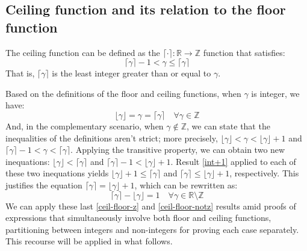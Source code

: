 \subsection*{Ceiling function and its relation to the floor function}

The ceiling function can be defined
as the $\lceil \cdot \rceil : \mathds{R} \to \mathds{Z}$ function
that satisfies:
\begin{equation}\tag{Ceiling}
  \lceil \gamma \rceil - 1 < \gamma \le \lceil \gamma \rceil
\end{equation}
That is,
$\lceil \gamma \rceil$ is the least integer
greater than or equal to $\gamma$.

Based on the definitions of the floor and ceiling functions,
when $\gamma$ is integer, we have:
\begin{equation}\label{ceil-floor-z}
  \lfloor \gamma \rfloor = \gamma = \lceil \gamma \rceil
  \quad \forall \gamma \in \mathds{Z}
\end{equation}
And, in the complementary scenario, when $\gamma \notin \mathds{Z}$,
we can state that the inequalities of the definitions aren't strict;
more precisely,
$\lfloor \gamma \rfloor < \gamma < \lfloor \gamma \rfloor + 1$
and $\lceil \gamma \rceil - 1 < \gamma < \lceil \gamma \rceil$.
Applying the transitive property, we can obtain two new inequations:
$\lfloor \gamma \rfloor < \lceil \gamma \rceil$
and $\lceil \gamma \rceil - 1 < \lfloor \gamma \rfloor + 1$.
Result \eqref{int+1}
applied to each of these two inequations yields
$\lfloor \gamma \rfloor + 1 \le \lceil \gamma \rceil$ and
$\lceil \gamma \rceil \le \lfloor \gamma \rfloor + 1$, respectively.
This justifies the equation
$\lceil \gamma \rceil = \lfloor \gamma \rfloor + 1$,
which can be rewritten as:
\begin{equation}\label{ceil-floor-notz}
  \lceil \gamma \rceil - \lfloor \gamma \rfloor = 1
  \quad \forall \gamma \in \mathds{R} \setminus \mathds{Z}
\end{equation}
We can apply
these last \eqref{ceil-floor-z} and \eqref{ceil-floor-notz} results
amid proofs of expressions
that simultaneously involve both floor and ceiling functions,
partitioning between integers and non-integers
for proving each case separately.
This recourse will be applied in what follows.

